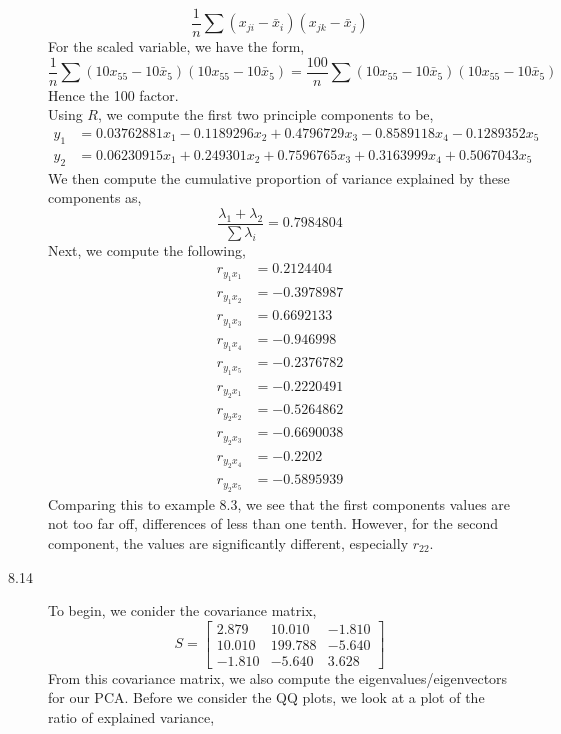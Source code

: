 \documentclass[letterpaper,10pt]{article}
\begin{document}
\begin{description}
\[\frac{1}{n}\sum(x_{ji}-\bar{x}_i)(x_{jk}-\bar{x}_j)\]
For the scaled variable, we have the form,
\[\frac{1}{n}\sum(10x_{55}-10\bar{x}_5)(10x_{55}-10\bar{x}_5)=\frac{100}{n}\sum(10x_{55}-10\bar{x}_5)(10x_{55}-10\bar{x}_5)\]
Hence the 100 factor.\\
Using $R$, we compute the first two principle components to be,
\begin{align*}
y_1 &= 0.03762881x_1-0.1189296x_2+0.4796729x_3-0.8589118x_4-0.1289352x_5\\
y_2 &= 0.06230915x_1 +0.249301x_2 +0.7596765x_3 +0.3163999x_4 +0.5067043x_5
\end{align*}
We then compute the cumulative proportion of variance explained by these components as,
\[\frac{\lambda_1+\lambda_2}{\sum \lambda_i}=0.7984804\]
Next, we compute the following,
\begin{align*}
r_{y_1x_1} &= 0.2124404\\
r_{y_1x_2} &= -0.3978987\\
r_{y_1x_3} &= 0.6692133\\
r_{y_1x_4} &= -0.946998\\
r_{y_1x_5} &= -0.2376782\\
r_{y_2x_1} &= -0.2220491\\
r_{y_2x_2} &= -0.5264862\\
r_{y_2x_3} &= -0.6690038\\
r_{y_2x_4} &= -0.2202\\
r_{y_2x_5} &= -0.5895939
\end{align*}
Comparing this to example 8.3, we see that the first components values are not too far off, differences of less than one tenth. However, for the second component, the values are significantly different, especially $r_{22}$.
\item[8.14] To begin, we conider the covariance matrix,
\[S=\begin{bmatrix}
2.879 & 10.010 & -1.810\\
10.010 & 199.788 & -5.640\\
-1.810 & -5.640 & 3.628
\end{bmatrix} \]
From this covariance matrix, we also compute the eigenvalues/eigenvectors for our PCA. Before we consider the QQ plots, we look at a plot of the ratio of explained variance,
\begin{center}

\end{center}
\end{description}
\end{document}
